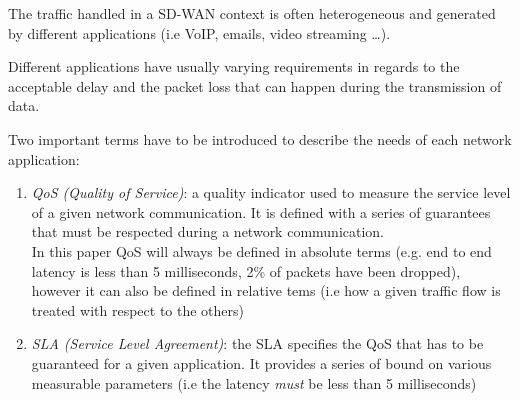 The traffic handled in a SD-WAN context is often heterogeneous and generated by different applications (i.e VoIP, emails, video streaming \dots).

Different applications have usually varying requirements in regards to the acceptable delay and the packet loss that can happen during the transmission of data.

Two important terms have to be introduced to describe the needs of each network application:
\begin{enumerate}
	\item \textit{QoS (Quality of Service)}: a quality indicator used to measure the service level of a given network communication.  It is defined with a series of guarantees that must be respected during a network communication. \\
	In this paper QoS will always be defined in absolute terms (e.g. end to end latency is less than 5 milliseconds,  2\% of packets have been dropped), however it can also be defined in relative tems (i.e how a given traffic flow is   treated with respect to the others)
	\item \textit{SLA (Service Level Agreement)}: the SLA specifies the QoS that has to be guaranteed for a given application. It provides a series of bound on various measurable parameters (i.e the latency \textit{must} be less than 5 milliseconds)
\end{enumerate}

